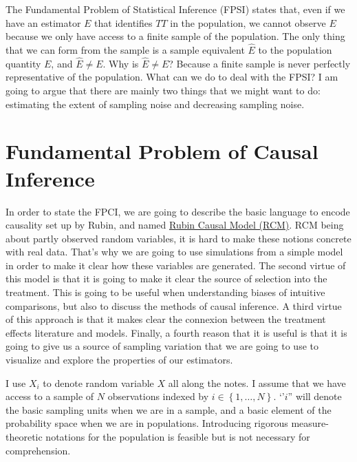 \documentclass[]{book}
\theoremstyle{definition}
\theoremstyle{definition}
\theoremstyle{definition}
\theoremstyle{remark}
\begin{document}
The Fundamental Problem of Statistical Inference (FPSI) states that,
even if we have an estimator \(E\) that identifies \(TT\) in the
population, we cannot observe \(E\) because we only have access to a
finite sample of the population. The only thing that we can form from
the sample is a sample equivalent \(\hat{E}\) to the population quantity
\(E\), and \(\hat{E}\neq E\). Why is \(\hat{E}\neq E\)? Because a finite
sample is never perfectly representative of the population. What can we
do to deal with the FPSI? I am going to argue that there are mainly two
things that we might want to do: estimating the extent of sampling noise
and decreasing sampling noise.

\chapter{Fundamental Problem of Causal Inference}\label{FPCI}

In order to state the FPCI, we are going to describe the basic language
to encode causality set up by Rubin, and named \href{RCM.html}{Rubin
Causal Model (RCM)}. RCM being about partly observed random variables,
it is hard to make these notions concrete with real data. That's why we
are going to use simulations from a simple model in order to make it
clear how these variables are generated. The second virtue of this model
is that it is going to make it clear the source of selection into the
treatment. This is going to be useful when understanding biases of
intuitive comparisons, but also to discuss the methods of causal
inference. A third virtue of this approach is that it makes clear the
connexion between the treatment effects literature and models. Finally,
a fourth reason that it is useful is that it is going to give us a
source of sampling variation that we are going to use to visualize and
explore the properties of our estimators.

I use \(X_i\) to denote random variable \(X\) all along the notes. I
assume that we have access to a sample of \(N\) observations indexed by
\(i\in\left\{1,\dots,N\right\}\). `'\(i\)'' will denote the basic
sampling units when we are in a sample, and a basic element of the
probability space when we are in populations. Introducing rigorous
measure-theoretic notations for the population is feasible but is not
necessary for comprehension.
\end{document}
